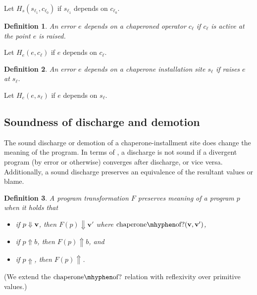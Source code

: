 \documentclass{sigplanconf}
\newtheorem{definition}{Definition}
\begin{document}
Let $H_s(s_{\ell_1},c_{\ell_0})$ if $s_{\ell_1}$ depends on $c_{\ell_0}$.

\begin{definition}
An error $e$ \emph{depends} on a chaperoned operator $c_\ell$ if $c_\ell$  is active at the point $e$ is raised.
\end{definition}

Let $H_e(e,c_\ell)$ if $e$ depends on $c_\ell$.

\begin{definition}
An error $e$ \emph{depends} on a chaperone installation site $s_\ell$ if  raises $e$ at $s_\ell$.
\end{definition}

Let $H_e(e,s_\ell)$ if $e$ depends on $s_\ell$.


\subsection{Soundness of discharge and demotion}

The sound discharge or demotion of a chaperone-installment site does change the meaning of the program.
In terms of \chapcalc, a discharge is not sound if a divergent program (by error or otherwise) converges after discharge, or vice versa.
Additionally, a sound discharge preserves an equivalence of the resultant values or blame.

\begin{definition}
A program transformation $F$ \emph{preserves meaning} of a program $p$ when it holds that
\begin{itemize}
\item if $p\Downarrow\mathbf{v}$, then $F(p)\Downarrow\mathbf{v'}$ where $\mathrm{chaperone\mhyphen of?}(\vv,\vvp)$,
\item if $p\Uparrow b$, then $F(p)\Uparrow b$, and
\item if $p\Uparrow$, then $F(p)\Uparrow$.
\end{itemize}
\end{definition}

(We extend the $\mathrm{chaperone\mhyphen of?}$ relation with reflexivity over primitive values.)
\end{document}
